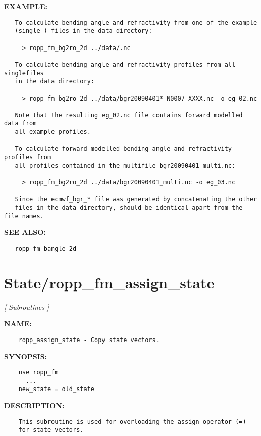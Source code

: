 \textbf{EXAMPLE:}\hspace{0.08in}\begin{Verbatim}
   To calculate bending angle and refractivity from one of the example
   (single-) files in the data directory:

     > ropp_fm_bg2ro_2d ../data/.nc

   To calculate bending angle and refractivity profiles from all singlefiles
   in the data directory:

     > ropp_fm_bg2ro_2d ../data/bgr20090401*_N0007_XXXX.nc -o eg_02.nc

   Note that the resulting eg_02.nc file contains forward modelled data from
   all example profiles.

   To calculate forward modelled bending angle and refractivity profiles from
   all profiles contained in the multifile bgr20090401_multi.nc:

     > ropp_fm_bg2ro_2d ../data/bgr20090401_multi.nc -o eg_03.nc

   Since the ecmwf_bgr_* file was generated by concatenating the other
   files in the data directory, should be identical apart from the file names.
\end{Verbatim}
\textbf{SEE ALSO:}\hspace{0.08in}\begin{Verbatim}
   ropp_fm_bangle_2d
\end{Verbatim}
\section{State/ropp\_fm\_assign\_state}
\textsl{[ Subroutines ]}

\label{ch:robo80}
\label{ch:State_ropp_fm_assign_state}
\textbf{NAME:}\hspace{0.08in}\begin{Verbatim}
    ropp_assign_state - Copy state vectors.
\end{Verbatim}
\textbf{SYNOPSIS:}\hspace{0.08in}\begin{Verbatim}
    use ropp_fm
      ...
    new_state = old_state
\end{Verbatim}
\textbf{DESCRIPTION:}\hspace{0.08in}\begin{Verbatim}
    This subroutine is used for overloading the assign operator (=)
    for state vectors.
\end{Verbatim}
